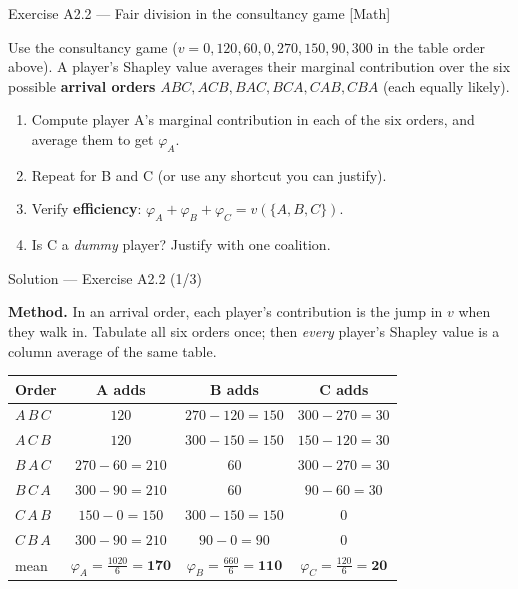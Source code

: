 \documentclass[aspectratio=169,11pt]{beamer}
\begin{document}
\begin{frame}{Exercise A2.2 --- Fair division in the consultancy game [Math]}
\begin{exercise}
  Use the consultancy game
  ($v = 0, 120, 60, 0, 270, 150, 90, 300$ in the table order above).
  A player's Shapley value averages their marginal contribution over the six
  possible \textbf{arrival orders} $ABC, ACB, BAC, BCA, CAB, CBA$ (each equally
  likely).
  \begin{enumerate}
    \item Compute player A's marginal contribution in each of the six orders,
          and average them to get $\varphi_A$.
    \item Repeat for B and C (or use any shortcut you can justify).
    \item Verify \textbf{efficiency}: $\varphi_A+\varphi_B+\varphi_C = v(\{A,B,C\})$.
    \item Is C a \emph{dummy} player? Justify with one coalition.
  \end{enumerate}
\end{exercise}
\end{frame}

\begin{frame}{Solution --- Exercise A2.2 (1/3)}
\begin{solutionbox}
  \textbf{Method.} In an arrival order, each player's contribution is the jump in
  $v$ when they walk in. Tabulate all six orders once; then \emph{every} player's
  Shapley value is a column average of the same table.
  \begin{center}
  \begin{tabular}{@{}lccc@{}}
    \toprule
    Order & A adds & B adds & C adds \\
    \midrule
    $A\,B\,C$ & $120$ & $270-120=150$ & $300-270=30$ \\
    $A\,C\,B$ & $120$ & $300-150=150$ & $150-120=30$ \\
    $B\,A\,C$ & $270-60=210$ & $60$ & $300-270=30$ \\
    $B\,C\,A$ & $300-90=210$ & $60$ & $90-60=30$ \\
    $C\,A\,B$ & $150-0=150$ & $300-150=150$ & $0$ \\
    $C\,B\,A$ & $300-90=210$ & $90-0=90$ & $0$ \\
    \midrule
    mean & $\varphi_A=\tfrac{1020}{6}=\mathbf{170}$ & $\varphi_B=\tfrac{660}{6}=\mathbf{110}$ & $\varphi_C=\tfrac{120}{6}=\mathbf{20}$ \\
    \bottomrule
  \end{tabular}
  \end{center}
\end{solutionbox}
\end{frame}
\end{document}
